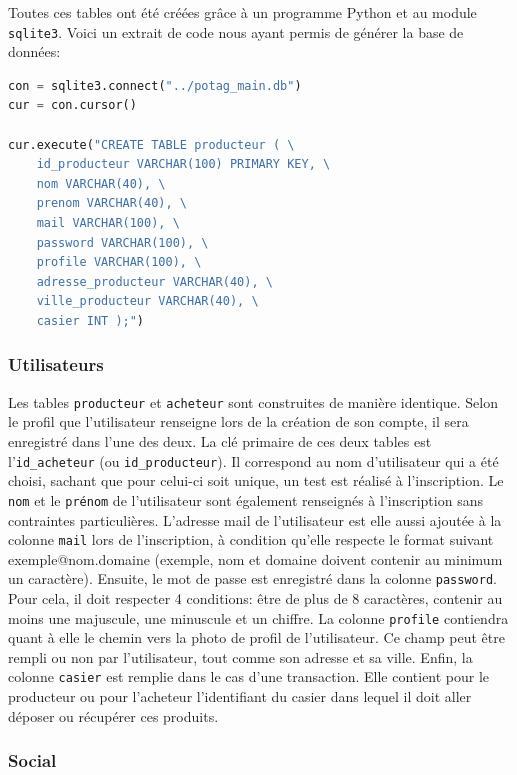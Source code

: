 \documentclass[11pt]{article}
\begin{document}
Toutes ces tables ont été créées grâce à un programme Python et au module \texttt{sqlite3}. Voici un extrait de code nous ayant permis de générer la base de données:

\begin{lstlisting}[language=Python, caption={Code Python permettant de créer la table \texttt{producteur}}]
con = sqlite3.connect("../potag_main.db")
cur = con.cursor()

cur.execute("CREATE TABLE producteur ( \
    id_producteur VARCHAR(100) PRIMARY KEY, \
    nom VARCHAR(40), \
    prenom VARCHAR(40), \
    mail VARCHAR(100), \
    password VARCHAR(100), \
    profile VARCHAR(100), \
    adresse_producteur VARCHAR(40), \
    ville_producteur VARCHAR(40), \
    casier INT );")
\end{lstlisting}
\subsubsection{Utilisateurs}

Les tables \texttt{producteur} et \texttt{acheteur} sont construites de manière identique. Selon le profil que l'utilisateur renseigne lors de la création de son compte, il sera enregistré dans l'une des deux. La clé primaire de ces deux tables est l'\texttt{id\_acheteur} (ou \texttt{id\_producteur}). Il correspond au nom d'utilisateur qui a été choisi, sachant que pour celui-ci soit unique, un test est réalisé à l'inscription. Le \texttt{nom} et le \texttt{prénom} de l'utilisateur sont également renseignés à l'inscription sans contraintes particulières. L'adresse mail de l'utilisateur est elle aussi ajoutée à la colonne \texttt{mail} lors de l'inscription, à condition qu'elle respecte le format suivant exemple@nom.domaine (exemple, nom et domaine doivent contenir au minimum un caractère). Ensuite, le mot de passe est enregistré dans la colonne \texttt{password}. Pour cela, il doit respecter 4 conditions: être de plus de 8 caractères, contenir au moins une majuscule, une minuscule et un chiffre. La colonne \texttt{profile} contiendra quant à elle le chemin vers la photo de profil de l'utilisateur. Ce champ peut être rempli ou non par l'utilisateur, tout comme son adresse et sa ville. Enfin, la colonne \texttt{casier} est remplie dans le cas d'une transaction. Elle contient pour le producteur ou pour l'acheteur l'identifiant du casier dans lequel il doit aller déposer ou récupérer ces produits. 

\subsubsection{Social}
\end{document}
